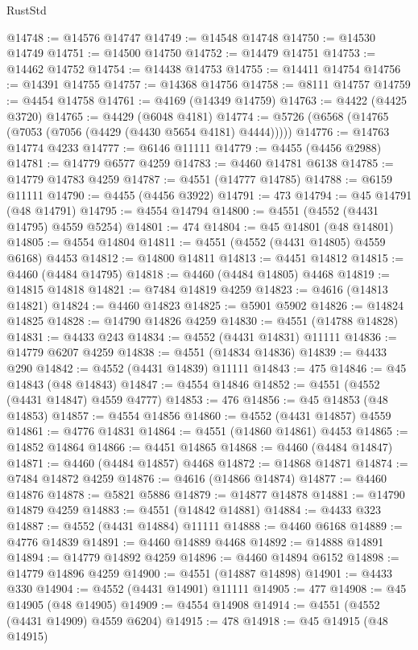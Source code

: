 \begin{lexlean}{RustStd}
\begin{coremodule}
@14748 := @14576 @14747
@14749 := @14548 @14748
@14750 := @14530 @14749
@14751 := @14500 @14750
@14752 := @14479 @14751
@14753 := @14462 @14752
@14754 := @14438 @14753
@14755 := @14411 @14754
@14756 := @14391 @14755
@14757 := @14368 @14756
@14758 := @8111 @14757
@14759 := @4454 @14758
@14761 := @4169 (@14349 @14759)
@14763 := @4422 (@4425 @3720)
@14765 := @4429 (@6048 @4181)
@14774 := @5726 (@6568 (@14765 (@7053 (@7056 (@4429 (@4430 @5654 @4181) @4444)))))
@14776 := @14763 @14774 @4233
@14777 := @6146 @11111
@14779 := @4455 (@4456 @2988)
@14781 := @14779 @6577 @4259
@14783 := @4460 @14781 @6138
@14785 := @14779 @14783 @4259
@14787 := @4551 (@14777 @14785)
@14788 := @6159 @11111
@14790 := @4455 (@4456 @3922)
@14791 := 473
@14794 := @45 @14791 (@48 @14791)
@14795 := @4554 @14794
@14800 := @4551 (@4552 (@4431 @14795) @4559 @5254)
@14801 := 474
@14804 := @45 @14801 (@48 @14801)
@14805 := @4554 @14804
@14811 := @4551 (@4552 (@4431 @14805) @4559 @6168) @4453
@14812 := @14800 @14811
@14813 := @4451 @14812
@14815 := @4460 (@4484 @14795)
@14818 := @4460 (@4484 @14805) @4468
@14819 := @14815 @14818
@14821 := @7484 @14819 @4259
@14823 := @4616 (@14813 @14821)
@14824 := @4460 @14823
@14825 := @5901 @5902
@14826 := @14824 @14825
@14828 := @14790 @14826 @4259
@14830 := @4551 (@14788 @14828)
@14831 := @4433 @243
@14834 := @4552 (@4431 @14831) @11111
@14836 := @14779 @6207 @4259
@14838 := @4551 (@14834 @14836)
@14839 := @4433 @290
@14842 := @4552 (@4431 @14839) @11111
@14843 := 475
@14846 := @45 @14843 (@48 @14843)
@14847 := @4554 @14846
@14852 := @4551 (@4552 (@4431 @14847) @4559 @4777)
@14853 := 476
@14856 := @45 @14853 (@48 @14853)
@14857 := @4554 @14856
@14860 := @4552 (@4431 @14857) @4559
@14861 := @4776 @14831
@14864 := @4551 (@14860 @14861) @4453
@14865 := @14852 @14864
@14866 := @4451 @14865
@14868 := @4460 (@4484 @14847)
@14871 := @4460 (@4484 @14857) @4468
@14872 := @14868 @14871
@14874 := @7484 @14872 @4259
@14876 := @4616 (@14866 @14874)
@14877 := @4460 @14876
@14878 := @5821 @5886
@14879 := @14877 @14878
@14881 := @14790 @14879 @4259
@14883 := @4551 (@14842 @14881)
@14884 := @4433 @323
@14887 := @4552 (@4431 @14884) @11111
@14888 := @4460 @6168
@14889 := @4776 @14839
@14891 := @4460 @14889 @4468
@14892 := @14888 @14891
@14894 := @14779 @14892 @4259
@14896 := @4460 @14894 @6152
@14898 := @14779 @14896 @4259
@14900 := @4551 (@14887 @14898)
@14901 := @4433 @330
@14904 := @4552 (@4431 @14901) @11111
@14905 := 477
@14908 := @45 @14905 (@48 @14905)
@14909 := @4554 @14908
@14914 := @4551 (@4552 (@4431 @14909) @4559 @6204)
@14915 := 478
@14918 := @45 @14915 (@48 @14915)

\end{coremodule}
\end{lexlean}
